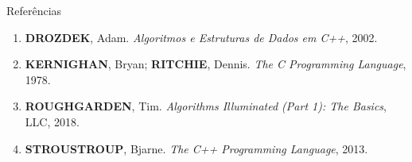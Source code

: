 \begin{frame}[fragile]{Referências}

    \begin{enumerate}
        \item \textbf{DROZDEK}, Adam. \textit{Algoritmos e Estruturas de Dados em C++}, 2002.


        \item \textbf{KERNIGHAN}, Bryan; \textbf{RITCHIE}, Dennis. \textit{The C Programming Language}, 1978.

        \item \textbf{ROUGHGARDEN}, Tim. \textit{Algorithms Illuminated (Part 1): The Basics}, LLC, 2018.

        \item \textbf{STROUSTROUP}, Bjarne. \textit{The C++ Programming Language}, 2013.

    \end{enumerate}

\end{frame}
